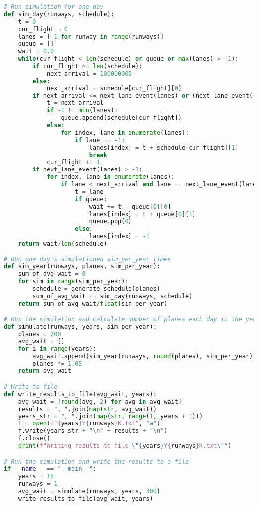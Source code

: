 \begin{lstlisting}[language=Python, caption={airplanes.py}]
# Run simulation for one day
def sim_day(runways, schedule):
    t = 0
    cur_flight = 0
    lanes = [-1 for runway in range(runways)]
    queue = []
    wait = 0.0
    while(cur_flight < len(schedule) or queue or max(lanes) > -1):
        if cur_flight >= len(schedule):
            next_arrival = 100000000
        else:
            next_arrival = schedule[cur_flight][0]
        if next_arrival <= next_lane_event(lanes) or (next_lane_event(lanes) == -1 and cur_flight < len(schedule)):
            t = next_arrival
            if -1 != min(lanes):
                queue.append(schedule[cur_flight])
            else:
                for index, lane in enumerate(lanes):
                    if lane == -1:
                        lanes[index] = t + schedule[cur_flight][1]
                        break
            cur_flight += 1
        if next_lane_event(lanes) > -1:
            for index, lane in enumerate(lanes):
                if lane < next_arrival and lane == next_lane_event(lanes):
                    t = lane
                    if queue:
                        wait += t - queue[0][0]
                        lanes[index] = t + queue[0][1]
                        queue.pop(0)
                    else:
                        lanes[index] = -1
    return wait/len(schedule)

# Run one day's simulationen sim_per_year times
def sim_year(runways, planes, sim_per_year):
    sum_of_avg_wait = 0
    for sim in range(sim_per_year):
        schedule = generate_schedule(planes)
        sum_of_avg_wait += sim_day(runways, schedule)
    return sum_of_avg_wait/float(sim_per_year)

# Run the simulation and calculate number of planes each day in the year
def simulate(runways, years, sim_per_year):
    planes = 200
    avg_wait = []
    for i in range(years):
        avg_wait.append(sim_year(runways, round(planes), sim_per_year))
        planes *= 1.05
    return avg_wait

# Write to file
def write_results_to_file(avg_wait, years):
    avg_wait = [round(avg, 2) for avg in avg_wait]
    results = ", ".join(map(str, avg_wait))
    years_str = ", ".join(map(str, range(1, years + 1)))
    f = open(f"{years}Y{runways}K.txt", "w")
    f.write(years_str + "\n" + results + "\n")
    f.close()
    print(f"Writing results to file \"{years}Y{runways}K.txt\"")

# Run the simulation and write the results to a file
if __name__ == "__main__":
    years = 15
    runways = 1
    avg_wait = simulate(runways, years, 300)
    write_results_to_file(avg_wait, years)
\end{lstlisting}


